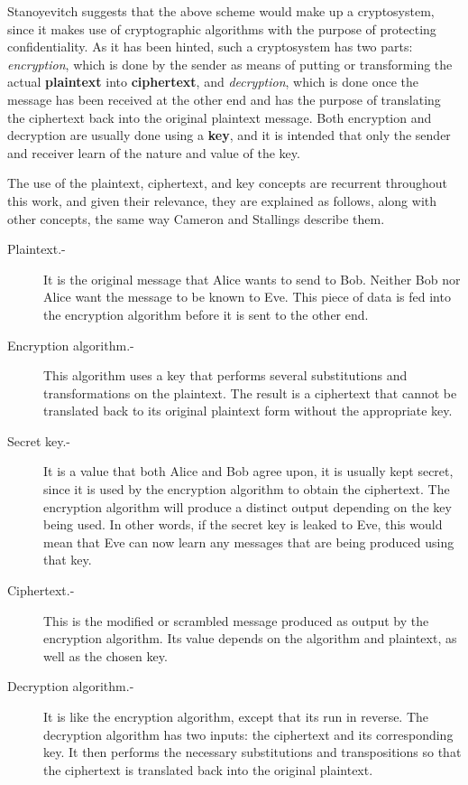 Stanoyevitch \cite{IntroCryptoMath} suggests that the above scheme would make up a cryptosystem, since it makes use of cryptographic algorithms with the purpose of protecting confidentiality. As it has been hinted, such a cryptosystem has two parts: \emph{encryption}, which is done by the sender as means of putting or transforming the actual \textbf{plaintext} into \textbf{ciphertext}, and \emph{decryption}, which is done once the message has been received at the other end and has the purpose of translating the ciphertext back into the original plaintext message. Both encryption and decryption are usually done using a \textbf{key}, and it is intended that only the sender and receiver learn of the nature and value of the key. 

The use of the plaintext, ciphertext, and key concepts are recurrent throughout this work, and given their relevance, they are explained as follows, along with other concepts, the same way Cameron \cite{CryptoNotes} and Stallings \cite{CryptoStallings} describe them.
\begin{description}
\item[Plaintext.-] It is the original message that Alice wants to send to Bob. Neither Bob nor Alice want the message to be known to Eve. This piece of data is fed into the encryption algorithm before it is sent to the other end.
\item[Encryption algorithm.-] This algorithm uses a key that performs several substitutions and transformations on the plaintext. The result is a ciphertext that cannot be translated back to its original plaintext form without the appropriate key.
\item[Secret key.-] It is a value that both Alice and Bob agree upon, it is usually kept secret, since it is used by the encryption algorithm to obtain the ciphertext. The encryption algorithm will produce a distinct output depending on the key being used. In other words, if the secret key is leaked to Eve, this would mean that Eve can now learn any messages that are being produced using that key.
\item[Ciphertext.-] This is the modified or scrambled message produced as output by the encryption algorithm. Its value depends on the algorithm and plaintext, as well as the chosen key.
\item[Decryption algorithm.-] It is like the encryption algorithm, except that its run in reverse. The decryption algorithm has two inputs: the ciphertext and its corresponding key. It then performs the necessary substitutions and transpositions so that the ciphertext is translated back into the original plaintext.
\end{description}

